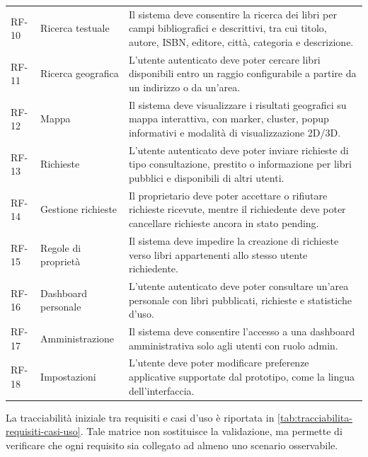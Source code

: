 \begin{longtable}{p{}p{}p{}}
    RF-10 & Ricerca testuale & Il sistema deve consentire la ricerca dei libri per campi bibliografici e descrittivi, tra cui titolo, autore, ISBN, editore, città, categoria e descrizione. \\
    RF-11 & Ricerca geografica & L'utente autenticato deve poter cercare libri disponibili entro un raggio configurabile a partire da un indirizzo o da un'area. \\
    RF-12 & Mappa & Il sistema deve visualizzare i risultati geografici su mappa interattiva, con marker, cluster, popup informativi e modalità di visualizzazione 2D/3D. \\
    RF-13 & Richieste & L'utente autenticato deve poter inviare richieste di tipo consultazione, prestito o informazione per libri pubblici e disponibili di altri utenti. \\
    RF-14 & Gestione richieste & Il proprietario deve poter accettare o rifiutare richieste ricevute, mentre il richiedente deve poter cancellare richieste ancora in stato pending. \\
    RF-15 & Regole di proprietà & Il sistema deve impedire la creazione di richieste verso libri appartenenti allo stesso utente richiedente. \\
    RF-16 & Dashboard personale & L'utente autenticato deve poter consultare un'area personale con libri pubblicati, richieste e statistiche d'uso. \\
    RF-17 & Amministrazione & Il sistema deve consentire l'accesso a una dashboard amministrativa solo agli utenti con ruolo admin. \\
    RF-18 & Impostazioni & L'utente deve poter modificare preferenze applicative supportate dal prototipo, come la lingua dell'interfaccia. \\
    \bottomrule
\end{longtable}

La tracciabilità iniziale tra requisiti e casi d'uso è riportata in \cref{tab:tracciabilita-requisiti-casi-uso}. Tale matrice non sostituisce la validazione, ma permette di verificare che ogni requisito sia collegato ad almeno uno scenario osservabile.

